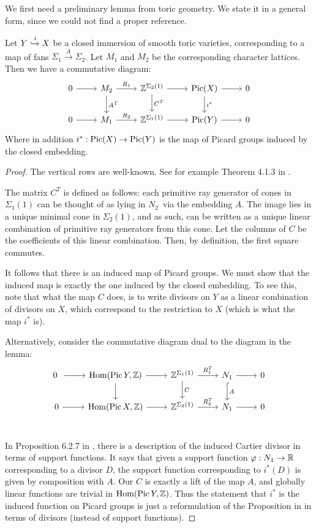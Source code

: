 We first need a preliminary lemma from toric geometry. We state it in a general form, since we could not find a proper reference.

\begin{lemma}
\label{lemma:induced}
Let $Y \xhookrightarrow{i} X$ be a closed immersion of smooth toric varieties, corresponding to a map of fans $\Sigma_1 \xrightarrow{A} \Sigma_2$. Let $M_1$ and $M_2$ be the corresponding character lattices. Then we have a commutative diagram:
\[
\begin{tikzcd}
0 \arrow{r} &  M_2 \arrow{r}{R_1} \arrow{d}{A^T} & \Z^{\Sigma_2(1)} \arrow{d}{C^T} \arrow{r} & \Pic(X)  \arrow{d}{i^\ast} \arrow{r} & 0\\
0 \arrow{r} &  M_1 \arrow{r}{R_2} & \Z^{\Sigma_1(1)} \arrow{r} & \Pic(Y) \arrow{r} & 0
\end{tikzcd}
\]
Where in addition $i^\ast : \operatorname{Pic}(X) \to \operatorname{Pic}(Y)$ is the map of Picard groups induced by the closed embedding.
\end{lemma}
\begin{proof}
The vertical rows are well-known. See for example Theorem 4.1.3 in \cite{cox_toric}.

The matrix $C^T$ is defined as follows: each primitive ray generator of cones in $\Sigma_1(1)$  can be thought of as lying in $N_2$ via the embedding $A$. The image lies in a unique minimal cone in $\Sigma_2(1)$, and as such, can be written as a unique linear combination of primitive ray generators from this cone. Let the columns of $C$ be the coefficients of this linear combination. Then, by definition, the first square commutes.

It follows that there is an induced map of Picard groups. We must show that the induced map is exactly the one induced by the closed embedding. To see this, note that what the map $C$ does, is to write divisors on $Y$ as a linear combination of divisors on $X$, which correspond to the restriction to $X$ (which is what the map $i^\ast$ is).

Alternatively, consider the commutative diagram dual to the diagram in the lemma:
\[
\begin{tikzcd}
0 \ar{r} & \Hom(\Pic Y,\Z) \arrow{r} \arrow{d} & \Z^{\Sigma_1(1)} \arrow{r}{R_1^T} \arrow{d}{C} & N_1 \arrow{r} \arrow[hookrightarrow]{d}{A} & 0 \\
0 \ar{r} & \Hom(\Pic X,\Z) \arrow{r} & \Z^{\Sigma_2(1)} \arrow{r}{R_2^T} & N_1 \arrow{r} & 0 \\
\end{tikzcd}
\]

In Proposition 6.2.7 in \cite{cox_toric}, there is a description of the induced Cartier divisor in terms of support functions. It says that given a support function $\varphi:N_1 \to \mathbb{R}$ corresponding to a divisor $D$,  the support function corresponding to $i^\ast(D)$ is given by composition with $A$. Our $C$ is exactly a lift of the map $A$, and globally linear functions are trivial in $\operatorname{Hom}(\operatorname{Pic} Y,\mathbb{Z})$. Thus the statement that $i^\ast$ is the induced function on Picard groups is just a reformulation of the Proposition in \cite{cox_toric} in terms of divisors (instead of support functions).
\end{proof}



